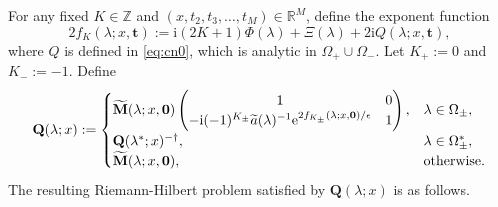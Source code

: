 \documentclass[12pt]{amsart}
\numberwithin{equation}{section}
\newcommand{\ee}{\mathrm{e}}
\newcommand{\ii}{\mathrm{i}}
\newcommand{\SP}{\lambda}
\newcommand{\phaseint}{\Phi}
\newcommand{\tailint}{\Xi}
\newcommand{\Z}{\mathbb{Z}}
\def\eq{\begin{equation}}
\def\endeq{\end{equation}}
\begin{document}
For any fixed $K \in \Z$ and $(x,t_2,t_3,\dots,t_M)\in\mathbb{R}^M$, define the exponent function
\begin{equation}
	2f_K(\SP;x,\mathbf{t}) :=  \ii (2K+1) \phaseint(\SP) + \tailint(\SP) + 2\ii Q(\SP;x,\mathbf{t}),
	\label{eq:fK-define}
\end{equation}
where $Q$ is defined in \eqref{eq:cn0},
which is analytic in $\Omega_+ \cup \Omega_-$. Let $K_+:=0$ and $K_-:=-1$. Define
\eq
{\bf Q}(\SP;x):=\begin{cases} \widetilde{\bf M}(\SP;x,\mathbf{0}) 
\begin{pmatrix} 1 & 0 \\ -\ii(-1)^{K_\pm}\widetilde{a}(\lambda)^{-1} \ee^{2f_{K_\pm}(\SP;x,\mathbf{0})/\epsilon} & 1 \end{pmatrix}, 
& \SP\in\Omega_\pm, \\ 
{\bf Q}(\SP^*;x)^{-\dagger}, & \SP\in\Omega_\pm^*, \\ \widetilde{\bf M}(\SP;x,\mathbf{0}), & \text{otherwise}. \end{cases}
\label{eq:Qdef}
\endeq
The resulting Riemann-Hilbert problem satisfied by $\mathbf{Q}(\SP;x)$ is as follows.
\end{document}

